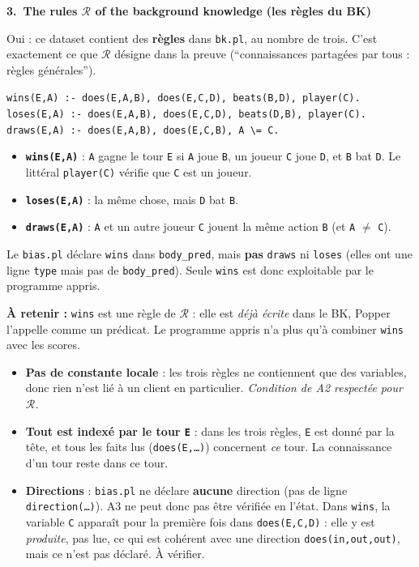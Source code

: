 \documentclass[10pt]{article}
\newcommand{\titrebox}[2]{\needspace{10\baselineskip}\vspace{8pt}
  \begin{tcolorbox}[colback=marine, colframe=marine, arc=0pt, boxrule=0pt,
    top=4pt, bottom=4pt, left=8pt]
  \color{white}\Large\bfseries #1.~#2
  \end{tcolorbox}\vspace{2pt}}
\newcommand{\ce}[1]{\begin{pourquoi}\textbf{\textcolor{marine}{À retenir :}} #1\end{pourquoi}}
\newcommand{\st}[1]{\par\needspace{7\baselineskip}\vspace{5pt}{\normalsize\bfseries\textcolor{marine}{#1}}\par\vspace{2pt}}
\begin{document}
\titrebox{3}{The rules $\mathcal{R}$ of the background knowledge (les règles du BK)}
Oui : ce dataset contient des \textbf{règles} dans \texttt{bk.pl}, au nombre de trois. C'est exactement ce que $\mathcal{R}$ désigne dans la preuve (``connaissances partagées par tous : règles générales'').
\begin{moi}
\texttt{wins(E,A) :- does(E,A,B), does(E,C,D), beats(B,D), player(C).}\\
\texttt{loses(E,A) :- does(E,A,B), does(E,C,D), beats(D,B), player(C).}\\
\texttt{draws(E,A) :- does(E,A,B), does(E,C,B), A \textbackslash= C.}
\end{moi}
\st{Comment les lire, ligne à ligne}
\begin{itemize}
  \item \textbf{\texttt{wins(E,A)}} : \texttt{A} gagne le tour \texttt{E} si \texttt{A} joue \texttt{B}, un joueur \texttt{C} joue \texttt{D}, et \texttt{B} bat \texttt{D}. Le littéral \texttt{player(C)} vérifie que \texttt{C} est un joueur.
  \item \textbf{\texttt{loses(E,A)}} : la même chose, mais \texttt{D} bat \texttt{B}.
  \item \textbf{\texttt{draws(E,A)}} : \texttt{A} et un autre joueur \texttt{C} jouent la même action \texttt{B} (et \texttt{A} $\neq$ \texttt{C}).
\end{itemize}
\st{Lesquelles Popper peut-il utiliser ?}
Le \texttt{bias.pl} déclare \texttt{wins} dans \texttt{body\_pred}, mais \textbf{pas} \texttt{draws} ni \texttt{loses} (elles ont une ligne \texttt{type} mais pas de \texttt{body\_pred}). Seule \texttt{wins} est donc exploitable par le programme appris.
\ce{\texttt{wins} est une règle de $\mathcal{R}$ : elle est \emph{déjà écrite} dans le BK, Popper l'appelle comme un prédicat. Le programme appris n'a plus qu'à combiner \texttt{wins} avec les scores.}

\st{Ces règles respectent-elles les hypothèses de la preuve ?}
\begin{itemize}
  \item \textbf{Pas de constante locale} : les trois règles ne contiennent que des variables, donc rien n'est lié à un client en particulier. \emph{Condition de A2 respectée pour $\mathcal{R}$.}
  \item \textbf{Tout est indexé par le tour \texttt{E}} : dans les trois règles, \texttt{E} est donné par la tête, et tous les faits lus (\texttt{does(E,\ldots)}) concernent \emph{ce} tour. La connaissance d'un tour reste dans ce tour.
  \item \textbf{Directions} : \texttt{bias.pl} ne déclare \textbf{aucune} direction (pas de ligne \texttt{direction(\ldots)}). A3 ne peut donc pas être vérifiée en l'état. Dans \texttt{wins}, la variable \texttt{C} apparaît pour la première fois dans \texttt{does(E,C,D)} : elle y est \emph{produite}, pas lue, ce qui est cohérent avec une direction \texttt{does(in,out,out)}, mais ce n'est pas déclaré. À vérifier.
\end{itemize}
\end{document}
